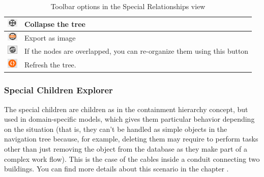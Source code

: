 \documentclass[a4paper]{article}
\begin{document}
		\begin{table}[h!]
			\centering
			\begin{tabular}{cl}
				\includegraphics[width=0.5cm]{img/icon_collapse_all.png} & Collapse the tree\\
				\midrule
				\includegraphics[width=0.5cm]{img/icon_export_as_image.png} & Export as image\\
				\midrule
				\includegraphics[width=0.5cm]{img/icon_reorganize_nodes.png} & If the nodes are overlapped, you can re-organize them using this button\\
    			\midrule
	 			\includegraphics[width=0.5cm]{img/icon_refresh_view.png} & Refresh the tree.\\
				\midrule
			\end{tabular}
			\caption{Toolbar options in the Special Relationships view}
			\label{tab:graphical_representation_relationships_toolbar_icons}
		\end{table}
			
		\subsubsection{Special Children Explorer} \label{sec:extra_explorers_children_explorer}							
		The special children are children as in the containment hierarchy concept, but used in domain-specific models, which gives them particular behavior depending on the situation (that is, they can't be handled as simple objects in the navigation tree because, for example, deleting them may require to perform tasks other than just removing the object from the database as they make part of a complex work flow). This is the case of the cables inside a conduit connecting two buildings. You can find more details about this scenario in the chapter \textbf{}.
						
\end{document}
